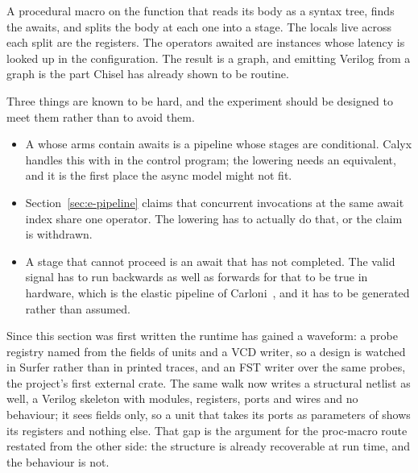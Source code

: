 A procedural macro on the function that reads its body as a syntax tree,
finds the awaits, and splits the body at each one into a stage. The
locals live across each split are the registers. The operators awaited
are instances whose latency is looked up in the configuration. The result
is a graph, and emitting Verilog from a graph is the part Chisel has
already shown to be routine.

Three things are known to be hard, and the experiment should be designed
to meet them rather than to avoid them.

\begin{itemize}
  \item {} A  whose arms
        contain awaits is a pipeline whose stages are conditional. Calyx
        handles this with  in the control program; the lowering
        needs an equivalent, and it is the first place the async model
        might not fit.
  \item {} Section~\ref{sec:e-pipeline} claims that
        concurrent invocations at the same await index share one
        operator. The lowering has to actually do that, or the claim is
        withdrawn.
  \item {} A stage that cannot proceed is an await that
        has not completed. The valid signal has to run backwards as well
        as forwards for that to be true in hardware, which is the elastic
        pipeline of Carloni~\cite{carloni2001}, and it has to be generated
        rather than assumed.
\end{itemize}

Since this section was first written the runtime has gained a
waveform: a probe registry named from the fields of units and a VCD
writer, so a design is watched in Surfer rather than in printed
traces, and an FST writer over the same probes, the project's first
external crate. The same walk now writes a
structural netlist as well, a Verilog skeleton with modules,
registers, ports and wires and no behaviour; it sees fields only, so a
unit that takes its ports as parameters of  shows its
registers and nothing else. That gap is the argument for the
proc-macro route restated from the other side: the structure is
already recoverable at run time, and the behaviour is not.

